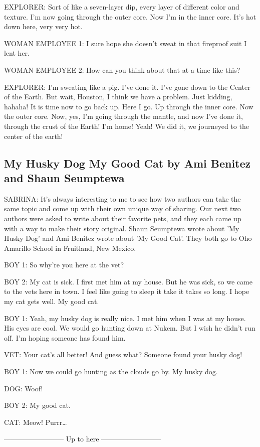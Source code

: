 EXPLORER:
Sort of like a seven-layer dip, every layer of different color and texture.
I'm now going through the outer core.
Now I'm in the inner core.
It's hot down here, very very hot.

WOMAN EMPLOYEE 1:
I sure hope she doesn't sweat in that fireproof suit I lent her.

WOMAN EMPLOYEE 2:
How can you think about that at a time like this?

EXPLORER:
I'm sweating like a pig.
I've done it.
I've gone down to the Center of the Earth.
But wait, Houston, I think we have a problem.
Just kidding, hahaha!
It is time now to go back up.
Here I go.
Up through the inner core.
Now the outer core.
Now, yes, I'm going through the mantle, and now I've done it, through the crust of the Earth!
I'm home!
Yeah!
We did it, we journeyed to the center of the earth!

\subsection{My Husky Dog My Good Cat by Ami Benitez and Shaun Seumptewa}

SABRINA:
It's always interesting to me to see how two authors can take the same topic and come up with their own unique way of sharing.
Our next two authors were asked to write about their favorite pets, and they each came up with a way to make their story original.
Shaun Seumptewa wrote about 'My Husky Dog' and Ami Benitez wrote about 'My Good Cat'.
They both go to Oho Amarillo School in Fruitland, New Mexico.

BOY 1:
So why're you here at the vet?

BOY 2:
My cat is sick.
I first met him at my house.
But he was sick, so we came to the vets here in town.
I feel like going to sleep it take it takes so long.
I hope my cat gets well.
My good cat.

BOY 1:
Yeah, my husky dog is really nice.
I met him when I was at my house.
His eyes are cool.
We would go hunting down at Nukem.
But I wish he didn't run off.
I'm hoping someone has found him.

VET:
Your cat's all better!
And guess what?
Someone found your husky dog!

BOY 1:
Now we could go hunting as the clouds go by.
My husky dog.

DOG:
Woof!

BOY 2:
My good cat.

CAT:
Meow!
Purrr\dots

-------------------------- Up to here --------------------------


